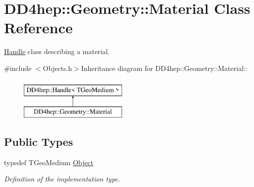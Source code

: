\hypertarget{class_d_d4hep_1_1_geometry_1_1_material}{
\section{DD4hep::Geometry::Material Class Reference}
\label{class_d_d4hep_1_1_geometry_1_1_material}
}


\hyperlink{class_d_d4hep_1_1_handle}{Handle} class describing a material.  


{\ttfamily \#include $<$Objects.h$>$}Inheritance diagram for DD4hep::Geometry::Material::\begin{figure}[H]
\begin{center}
\leavevmode
\includegraphics[height=2cm]{class_d_d4hep_1_1_geometry_1_1_material}
\end{center}
\end{figure}
\subsection*{Public Types}
\begin{DoxyCompactItemize}
\item 
typedef TGeoMedium \hyperlink{class_d_d4hep_1_1_geometry_1_1_material_afdf167b558006f1bf7348fa5e812f4d8}{Object}
\begin{DoxyCompactList}\small\item\em Definition of the implementation type. \item\end{DoxyCompactList}\end{DoxyCompactItemize}
